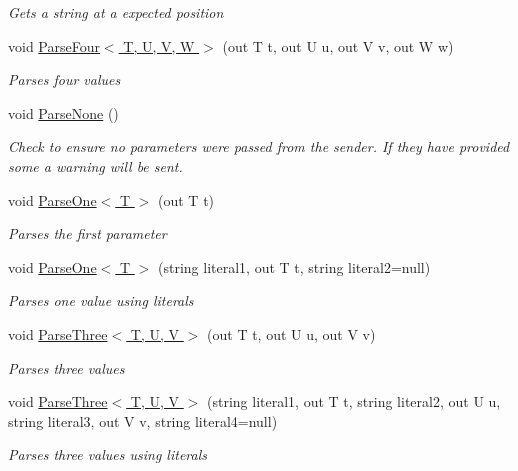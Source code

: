 \begin{DoxyCompactItemize}
\begin{DoxyCompactList}\small\item\em Gets a string at a expected position \end{DoxyCompactList}\item 
void \hyperlink{classOTA_1_1Command_1_1ArgumentList_ad5daf3348e434c97f503293bdd161851}{Parse\+Four$<$ T, U, V, W $>$} (out T t, out U u, out V v, out W w)
\begin{DoxyCompactList}\small\item\em Parses four values \end{DoxyCompactList}\item 
void \hyperlink{classOTA_1_1Command_1_1ArgumentList_a209af7f7ace41e8442d259fa9bbab24c}{Parse\+None} ()
\begin{DoxyCompactList}\small\item\em Check to ensure no parameters were passed from the sender. If they have provided some a warning will be sent. \end{DoxyCompactList}\item 
void \hyperlink{classOTA_1_1Command_1_1ArgumentList_ab8722cb8a8b5d9b5d61b1cdb69d6e06b}{Parse\+One$<$ T $>$} (out T t)
\begin{DoxyCompactList}\small\item\em Parses the first parameter \end{DoxyCompactList}\item 
void \hyperlink{classOTA_1_1Command_1_1ArgumentList_a422904dfe49df9245dbe72ff7b032ec6}{Parse\+One$<$ T $>$} (string literal1, out T t, string literal2=null)
\begin{DoxyCompactList}\small\item\em Parses one value using literals \end{DoxyCompactList}\item 
void \hyperlink{classOTA_1_1Command_1_1ArgumentList_ad67bc7ccd7950ade47741b99cbee7499}{Parse\+Three$<$ T, U, V $>$} (out T t, out U u, out V v)
\begin{DoxyCompactList}\small\item\em Parses three values \end{DoxyCompactList}\item 
void \hyperlink{classOTA_1_1Command_1_1ArgumentList_ac413a2a09e591276306a8ebbfa3d103d}{Parse\+Three$<$ T, U, V $>$} (string literal1, out T t, string literal2, out U u, string literal3, out V v, string literal4=null)
\begin{DoxyCompactList}\small\item\em Parses three values using literals \end{DoxyCompactList}\item 

\end{DoxyCompactItemize}
